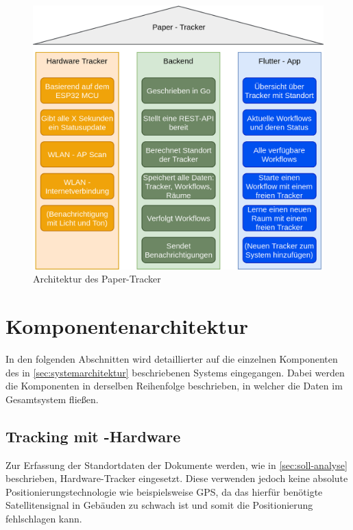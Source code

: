 \begin{figure}[h!tbp]
	\includegraphics[width=\textwidth]{images/architecture_de.png}
	\centering
	\caption{Architektur des Paper-Tracker}
	\label{fig:architecture}
\end{figure}

\section{Komponentenarchitektur} \label{sec:komponentenarchitektur}

In den folgenden Abschnitten wird detaillierter auf die einzelnen Komponenten des in
\autoref{sec:systemarchitektur} beschriebenen Systems eingegangen.
Dabei werden die Komponenten in derselben Reihenfolge beschrieben, in welcher die Daten im
Gesamtsystem fließen.

\subsection{Tracking mit -Hardware} \label{sec:tracking-hardware}

Zur Erfassung der Standortdaten der Dokumente werden, wie in \autoref{sec:soll-analyse}
beschrieben, Hardware-Tracker eingesetzt.
Diese verwenden jedoch keine absolute Positionierungstechnologie wie beispielsweise \gls{GPS}, da
das hierfür benötigte Satellitensignal in Gebäuden zu schwach ist und somit die Positionierung
fehlschlagen kann.

